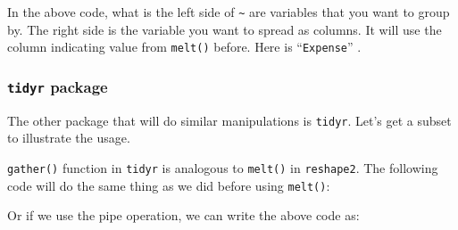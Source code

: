 \documentclass[12pt,]{krantz}
\makeatletter
\newenvironment{Shaded}{\begin{snugshade}}{\end{snugshade}}
\newcommand{\KeywordTok}[1]{\textcolor[rgb]{0.27,0.27,0.27}{\textbf{#1}}}
\newcommand{\DecValTok}[1]{\textcolor[rgb]{0.06,0.06,0.06}{#1}}
\newcommand{\StringTok}[1]{\textcolor[rgb]{0.5,0.5,0.5}{#1}}
\newcommand{\CommentTok}[1]{\textcolor[rgb]{0.37,0.37,0.37}{\textit{#1}}}
\newcommand{\OperatorTok}[1]{\textcolor[rgb]{0.43,0.43,0.43}{\textbf{#1}}}
\newcommand{\NormalTok}[1]{#1}
\newenvironment{kframe}{%
\medskip{}
\setlength{\fboxsep}{.8em}
 \def\at@end@of@kframe{}%
 \ifinner\ifhmode%
  \def\at@end@of@kframe{\end{minipage}}%
  \begin{minipage}{\columnwidth}%
 \fi\fi%
 \def\FrameCommand##1{\hskip\@totalleftmargin \hskip-\fboxsep
 \colorbox{shadecolor}{##1}\hskip-\fboxsep
     \hskip-\linewidth \hskip-\@totalleftmargin \hskip\columnwidth}%
 \MakeFramed {\advance\hsize-\width
   \@totalleftmargin\z@ \linewidth\hsize
   \@setminipage}}%
 {\par\unskip\endMakeFramed%
 \at@end@of@kframe}
\renewenvironment{Shaded}{\begin{kframe}}{\end{kframe}}
\theoremstyle{definition}
\theoremstyle{definition}
\theoremstyle{definition}
\theoremstyle{remark}
\makeatother
\begin{document}
In the above code, what is the left side of \texttt{\textasciitilde{}}
are variables that you want to group by. The right side is the variable
you want to spread as columns. It will use the column indicating value
from \texttt{melt()} before. Here is ``\texttt{Expense}'' .

\subsubsection{\texorpdfstring{\texttt{tidyr}
package}{tidyr package}}\label{tidyr-package}

The other package that will do similar manipulations is \texttt{tidyr}.
Let's get a subset to illustrate the usage.

\begin{Shaded}
\end{Shaded}

\texttt{gather()} function in \texttt{tidyr} is analogous to
\texttt{melt()} in \texttt{reshape2}. The following code will do the
same thing as we did before using \texttt{melt()}:

\begin{Shaded}
\end{Shaded}

Or if we use the pipe operation, we can write the above code as:

\begin{Shaded}
\end{Shaded}
\end{document}
